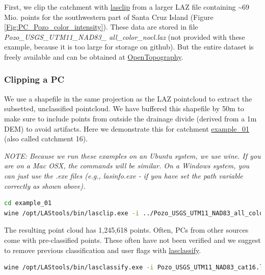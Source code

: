 \documentclass[a4paperpaper,,tablecaptionabove]{scrartcl}
\begin{document}
First, we clip the catchment with
\href{https://rapidlasso.com/lastools/lasclip/}{lasclip} from a larger
LAZ file containing \textasciitilde{}69 Mio. points for the southwestern
part of Santa Cruz Island (Figure \ref{Fig:PC_Pozo_color_intensity}).
These data are stored in file \emph{Pozo\_USGS\_UTM11\_NAD83\_
all\_color\_nocl.laz} (not provided with these example, because it is
too large for storage on github). But the entire dataset is freely
available and can be obtained at
\href{https://opentopography.org/}{OpenTopography}.

\hypertarget{clipping-a-pc}{%
\subsubsection{Clipping a PC}\label{clipping-a-pc}}

We use a shapefile in the same projection as the LAZ pointcloud to
extract the subsetted, unclassified pointcloud. We have buffered this
shapefile by 50m to make sure to include points from outside the
drainage divide (derived from a 1m DEM) to avoid artifacts. Here we
demonstrate this for catchment
\href{https://github.com/BodoBookhagen/PC_geomorph_roughness/tree/master/example_01}{example\_01}
(also called catchment 16).

\emph{NOTE: Because we run these examples on an Ubuntu system, we use
wine. If you are on a Mac OSX, the commands will be similar. On a
Windows system, you can just use the .exe files (e.g., lasinfo.exe - if
you have set the path variable correctly as shown above). }

\begin{lstlisting}[language=bash]
cd example_01
wine /opt/LAStools/bin/lasclip.exe -i ../Pozo_USGS_UTM11_NAD83_all_color_nocl.laz -poly Pozo_DTM_noveg_UTM11_NAD83_cat16_b50m.shp -o Pozo_USGS_UTM11_NAD83_cat16.laz
\end{lstlisting}

The resulting point cloud has 1,245,618 points. Often, PCs from other
sources come with pre-classified points. These often have not been
verified and we suggest to remove previous classification and user flags
with \href{https://rapidlasso.com/lastools/lasclassify/}{lasclassify}.

\begin{lstlisting}[language=bash]
wine /opt/LAStools/bin/lasclassify.exe -i Pozo_USGS_UTM11_NAD83_cat16.laz -olaz -set_user_data 0 -set_classification 0 -o Pozo_USGS_UTM11_NAD83_cat16_uncl.laz
\end{lstlisting}
\end{document}
